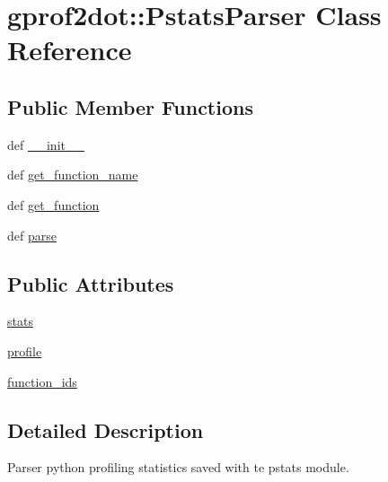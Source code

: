 \hypertarget{classgprof2dot_1_1PstatsParser}{
\section{gprof2dot::PstatsParser Class Reference}
\label{classgprof2dot_1_1PstatsParser}
}
\subsection*{Public Member Functions}
\begin{DoxyCompactItemize}
\item 
def \hyperlink{classgprof2dot_1_1PstatsParser_aae163faa874870a8e66abb03747d4717}{\_\-\_\-init\_\-\_\-}
\item 
def \hyperlink{classgprof2dot_1_1PstatsParser_a9acb9a197e12c5430bfc31e052eeeac4}{get\_\-function\_\-name}
\item 
def \hyperlink{classgprof2dot_1_1PstatsParser_ae5ee71d865a0b45af94c6a0138b88f49}{get\_\-function}
\item 
def \hyperlink{classgprof2dot_1_1PstatsParser_a99546b6e592c5f86c20854c14cce04af}{parse}
\end{DoxyCompactItemize}
\subsection*{Public Attributes}
\begin{DoxyCompactItemize}
\item 
\hyperlink{classgprof2dot_1_1PstatsParser_ae127f54aa3d60464512cbe3eb48ca4a6}{stats}
\item 
\hyperlink{classgprof2dot_1_1PstatsParser_acce97877de6c25eac07d02f456932c17}{profile}
\item 
\hyperlink{classgprof2dot_1_1PstatsParser_a84df49dd515602a38f5c80065aa61330}{function\_\-ids}
\end{DoxyCompactItemize}


\subsection{Detailed Description}
\begin{DoxyVerb}Parser python profiling statistics saved with te pstats module.\end{DoxyVerb}
 

